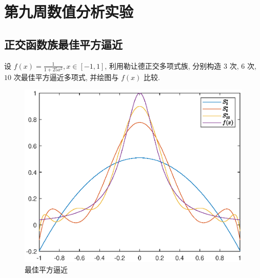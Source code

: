 \section{第九周数值分析实验}
\subsection{正交函数族最佳平方逼近}
\begin{ex}
	设 $f(x)=\frac{1}{1+25 x^2}, x \in[-1,1]$, 利用勒让德正交多项式族, 分别构造 $3$ 次, $6$ 次, $10$ 次最佳平方逼近多项式, 并绘图与 $f(x)$ 比较.
\end{ex}


\begin{figure}[H]
	\centering
	\includegraphics[width = 0.61\linewidth]{w9/figq1.eps}
	\caption{最佳平方逼近}
\end{figure}

